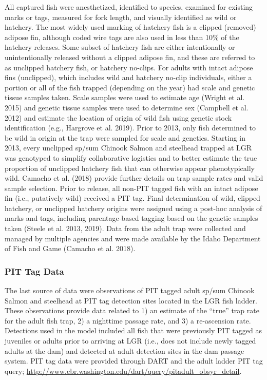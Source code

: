 \documentclass[
  12pt,
]{article}
\begin{document}
All captured fish were anesthetized, identified to species, examined for existing marks or tags, measured for fork length, and visually identified as wild or hatchery. The most widely used marking of hatchery fish is a clipped (removed) adipose fin, although coded wire tags are also used in less than 10\% of the hatchery releases. Some subset of hatchery fish are either intentionally or unintentionally released without a clipped adipose fin, and these are referred to as unclipped hatchery fish, or hatchery no-clips. For adults with intact adipose fins (unclipped), which includes wild and hatchery no-clip individuals, either a portion or all of the fish trapped (depending on the year) had scale and genetic tissue samples taken. Scale samples were used to estimate age (Wright et al. 2015) and genetic tissue samples were used to determine sex (Campbell et al. 2012) and estimate the location of origin of wild fish using genetic stock identification (e.g., Hargrove et al. 2019). Prior to 2013, only fish determined to be wild in origin at the trap were sampled for scale and genetics. Starting in 2013, every unclipped sp/sum Chinook Salmon and steelhead trapped at LGR was genotyped to simplify collaborative logistics and to better estimate the true proportion of unclipped hatchery fish that can otherwise appear phenotypically wild. Camacho et al. (2018) provide further details on trap sample rates and valid sample selection. Prior to release, all non-PIT tagged fish with an intact adipose fin (i.e., putatively wild) received a PIT tag. Final determination of wild, clipped hatchery, or unclipped hatchery origins were assigned using a post-hoc analysis of marks and tags, including parentage-based tagging based on the genetic samples taken (Steele et al. 2013, 2019). Data from the adult trap were collected and managed by multiple agencies and were made available by the Idaho Department of Fish and Game (Camacho et al. 2018).

\hypertarget{pit-tag-data}{%
\subsubsection{PIT Tag Data}\label{pit-tag-data}}

The last source of data were observations of PIT tagged adult sp/sum Chinook Salmon and steelhead at PIT tag detection sites located in the LGR fish ladder. These observations provide data related to 1) an estimate of the ``true'' trap rate for the adult fish trap, 2) a nighttime passage rate, and 3) a re-ascension rate. Detections used in the model included all fish that were previously PIT tagged as juveniles or adults prior to arriving at LGR (i.e., does not include newly tagged adults at the dam) and detected at adult detection sites in the dam passage system. PIT tag data were provided through DART and the adult ladder PIT tag query; \url{http://www.cbr.washington.edu/dart/query/pitadult_obsyr_detail}.
\end{document}
